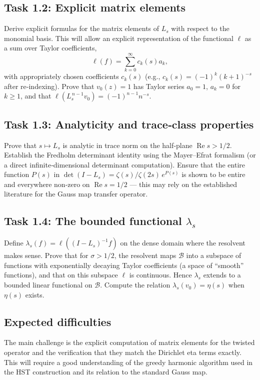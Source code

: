 \documentclass[11pt,a4paper]{article}
\newcommand{\RE}{\operatorname{Re}}
\begin{document}
\subsection{Task 1.2: Explicit matrix elements}
Derive explicit formulas for the matrix elements of $L_s$ with respect to the monomial basis.  This will allow an explicit representation of the functional $\ell$ as a sum over Taylor coefficients,
\[
\ell(f) = \sum_{k=0}^\infty c_k(s) a_k,
\]
with appropriately chosen coefficients $c_k(s)$ (e.g., $c_k(s) = (-1)^{k} (k+1)^{-s}$ after re‑indexing).  Prove that $v_0(z)=1$ has Taylor series $a_0=1$, $a_k=0$ for $k\ge 1$, and that $\ell( L_s^{\,n-1} v_0 ) = (-1)^{n-1} n^{-s}$.

\subsection{Task 1.3: Analyticity and trace‑class properties}
Prove that $s \mapsto L_s$ is analytic in trace norm on the half‑plane $\RE s > 1/2$.  Establish the Fredholm determinant identity using the Mayer–Efrat formalism (or a direct infinite‑dimensional determinant computation).  Ensure that the entire function $P(s)$ in $\det(I-L_s) = \zeta(s)/\zeta(2s)\, e^{P(s)}$ is shown to be entire and everywhere non‑zero on $\RE s = 1/2$ — this may rely on the established literature for the Gauss map transfer operator.

\subsection{Task 1.4: The bounded functional $\lambda_s$}
Define $\lambda_s(f) = \ell( (I-L_s)^{-1} f )$ on the dense domain where the resolvent makes sense.  Prove that for $\sigma > 1/2$, the resolvent maps $\mathcal{B}$ into a subspace of functions with exponentially decaying Taylor coefficients (a space of ``smooth'' functions), and that on this subspace $\ell$ is continuous.  Hence $\lambda_s$ extends to a bounded linear functional on $\mathcal{B}$.  Compute the relation $\lambda_s(v_0) = \eta(s)$ when $\eta(s)$ exists.

\subsection{Expected difficulties}
The main challenge is the explicit computation of matrix elements for the twisted operator and the verification that they match the Dirichlet eta terms exactly.  This will require a good understanding of the greedy harmonic algorithm used in the HST construction and its relation to the standard Gauss map.
\end{document}
